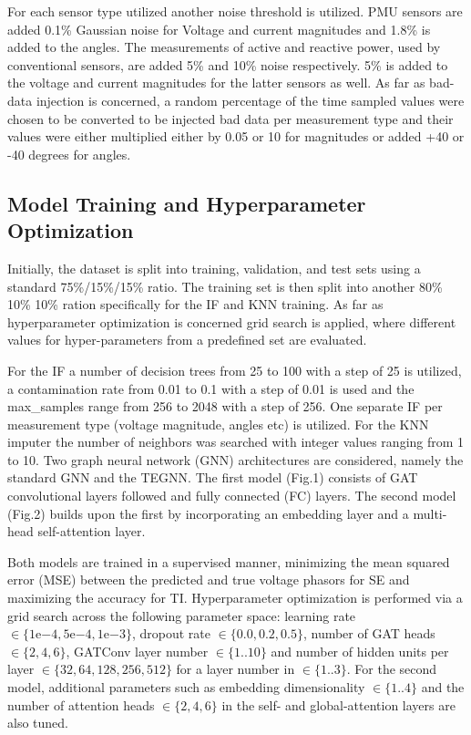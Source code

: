 \documentclass[journal]{IEEEtran}  %
\begin{document}
 For each sensor type utilized another noise threshold is utilized. PMU sensors are added 0.1\% Gaussian noise for Voltage and current magnitudes and 1.8\% is added to the angles. The measurements of active and reactive power, used by conventional sensors, are added 5\% and 10\% noise respectively. 5\% is added to the voltage and current magnitudes for the latter sensors as well. As far as bad-data injection is concerned, a random percentage of the time sampled values were chosen to be converted to be injected bad data per measurement type and their values were either multiplied either by 0.05 or 10 for magnitudes or added +40 or -40 degrees for angles.

\subsection{Model Training and Hyperparameter Optimization}

Initially, the dataset is split into training, validation, and test sets using a standard 75\%/15\%/15\% ratio. The training set is then split into another 80\% 10\% 10\% ration specifically for the IF and KNN training. As far as hyperparameter optimization is concerned grid search is applied, where different values for hyper-parameters from a predefined set are evaluated.

For the IF a number of decision trees from 25 to 100 with a step of 25 is utilized, a contamination rate from 0.01 to 0.1 with a step of 0.01 is used and the max_samples range from 256 to 2048 with a step of 256. One separate IF per measurement type (voltage magnitude, angles etc) is utilized. For the KNN imputer the number of neighbors was searched with integer values ranging from 1 to 10.  Two graph neural network (GNN) architectures are considered, namely the standard GNN and the TEGNN. The first model (Fig.1) consists of GAT convolutional layers followed and fully connected (FC) layers. The second model (Fig.2) builds upon the first by incorporating an embedding layer and a multi-head self-attention layer.

Both models are trained in a supervised manner, minimizing the mean squared error (MSE) between the predicted and true voltage phasors for SE and maximizing the accuracy for TI. Hyperparameter optimization is performed via a grid search across the following parameter space: learning rate $\in \{1\text{e}{-4}, 5\text{e}{-4}, 1\text{e}{-3}\}$, dropout rate $\in \{0.0, 0.2, 0.5\}$, number of GAT heads $\in \{2, 4, 6\}$, GATConv layer number $\in \{1..10\}$ and number of hidden units per layer $\in \{32, 64, 128, 256, 512\}$ for a layer number in $\in \{1..3\}$. For the second model, additional parameters such as embedding dimensionality $\in \{1..4\}$ and the number of attention heads $\in \{2, 4, 6\}$ in the self- and global-attention layers are also tuned.
\end{document}
